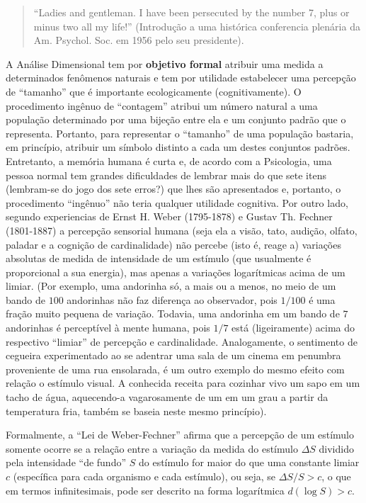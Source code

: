\begin{quote}
``Ladies and gentleman. I have been persecuted by the number 7, plus or minus two all my life!'' (Introdução a uma histórica conferencia plenária da Am. Psychol. Soc. em 1956 pelo seu presidente).

\end{quote}


    A Análise Dimensional tem por \textbf{objetivo formal} atribuir uma medida a determinados fenômenos naturais e tem por utilidade estabelecer uma percepção de ``tamanho'' que é importante ecologicamente (cognitivamente). O procedimento ingênuo de ``contagem'' atribui um número natural a uma população determinado por uma bijeção entre ela e um conjunto padrão que o representa. Portanto, para representar o ``tamanho'' de uma população bastaria, em princípio, atribuir um símbolo distinto a cada um destes conjuntos padrões. Entretanto, a memória humana é curta e, de acordo com a Psicologia, uma pessoa normal tem grandes dificuldades de lembrar mais do que sete itens (lembram-se do jogo dos sete erros?) que lhes são apresentados e, portanto, o procedimento ``ingênuo'' não teria qualquer utilidade cognitiva. Por outro lado, segundo experiencias de Ernst H. Weber (1795-1878) e Gustav Th. Fechner (1801-1887) a percepção sensorial humana (seja ela a visão, tato, audição, olfato, paladar e a cognição de cardinalidade) não percebe (isto é, reage a) variações absolutas de medida de intensidade de um estímulo (que usualmente é proporcional a sua energia), mas apenas a variações logarítmicas acima de um limiar. (Por exemplo, uma andorinha só, a mais ou a menos, no meio de um bando de \(100\) andorinhas não faz diferença ao observador, pois \(1/100\) é uma fração muito pequena de variação. Todavia, uma andorinha em um bando de \(7\) andorinhas é perceptível à mente humana, pois \(1/7\) está (ligeiramente) acima do respectivo ``limiar'' de percepção e cardinalidade. Analogamente, o sentimento de cegueira experimentado ao se adentrar uma sala de um cinema em penumbra proveniente de uma rua ensolarada, é um outro exemplo do mesmo efeito com relação o estímulo visual. A conhecida receita para cozinhar vivo um sapo em um tacho de água, aquecendo-a vagarosamente de um em um grau a partir da temperatura fria, também se baseia neste mesmo princípio).

    Formalmente, a ``Lei de Weber-Fechner'' afirma que a percepção de um estímulo somente ocorre se a relação entre a variação da medida do estímulo \(\Delta S\) dividido pela intensidade ``de fundo'' \(S\) do estímulo for maior do que uma constante limiar \(c\) (específica para cada organismo e cada estímulo), ou seja, se \(\Delta S/S > c\), o que em termos infinitesimais, pode ser descrito na forma logarítmica \(d(\log S) > c\).

